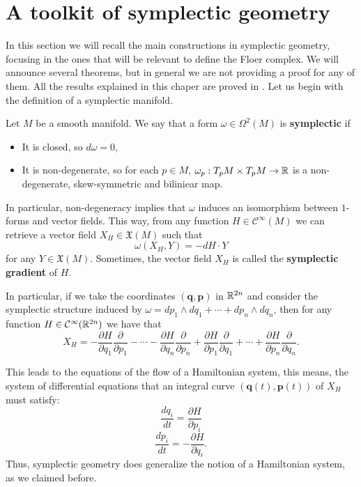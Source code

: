 \section{A toolkit of symplectic geometry}

In this section we will recall the main constructions in symplectic geometry, focusing in the ones that will be relevant to define the Floer complex. We will announce several theorems, but in general we are not providing a proof for any of them. All the results explained in this chaper are proved in \cite{da2001lectures}. Let us begin with the definition of a symplectic manifold.

\begin{deff}
Let $M$ be a smooth manifold. We say that a form $\omega \in \Omega^2(M)$ is {\bf symplectic} if

\begin{itemize}
	\item It is closed, so $d \omega = 0$,
	\item It is non-degenerate, so for each $p \in M$, $\omega_p : T_pM \times T_pM \rightarrow \mathbb{R}$ is a non-degenerate, skew-symmetric and biliniear map.
\end{itemize}
\end{deff}

In particular, non-degeneracy implies that $\omega$ induces an isomorphism between $1$-forms and vector fields. This way, from any function $H \in \mathcal{C}^{\infty}(M)$ we can retrieve a vector field $X_H \in \mathfrak{X}(M)$ such that
\[\omega(X_H,Y) = - d H \cdot Y\]
for any $Y \in \mathfrak{X}(M)$. Sometimes, the vector field $X_H$ is called the {\bf symplectic gradient} of $H$.

In particular, if we take the coordinates $(\mathbf{q},\mathbf{p})$ in $\mathbb{R}^{2n}$ and consider the symplectic structure induced by $\omega = d p_1 \wedge d q_1 + \cdots + d p_n \wedge d q_n$, then for any function $H \in \mathcal{C}^{\infty}(\mathbb{R}^{2n})$ we have that
\[X_H = - \frac{\partial H}{\partial q_1} \frac{\partial}{\partial p_1} - \cdots - \frac{\partial H}{\partial q_n} \frac{\partial}{\partial p_n} + \frac{\partial H}{\partial p_1} \frac{\partial}{\partial q_1} + \cdots + \frac{\partial H}{\partial p_n} \frac{\partial}{\partial q_n} .\]

This leads to the equations of the flow of a Hamiltonian system, this means, the system of differential equations that an integral curve $(\mathbf{q}(t),\mathbf{p}(t))$ of $X_H$ must satisfy:
\[\frac{d q_i}{d t} = \frac{\partial H}{\partial p_i}\]
\[\frac{d p_i}{d t} = - \frac{\partial H}{\partial q_i} .\]
Thus, symplectic geometry does generalize the notion of a Hamiltonian system, as we claimed before.

